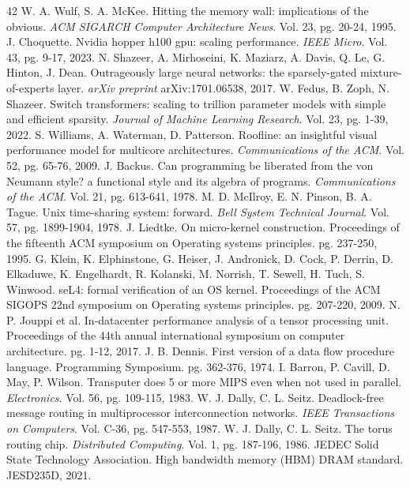 \documentclass[10pt,twocolumn]{article}
\begin{document}
\begin{thebibliography}{42}
 W. A. Wulf, S. A. McKee. Hitting the memory wall: implications of the obvious. \textit{ACM SIGARCH Computer Architecture News}. Vol. 23, pg. 20-24, 1995.
 J. Choquette. Nvidia hopper h100 gpu: scaling performance. \textit{IEEE Micro}. Vol. 43, pg. 9-17, 2023.
 N. Shazeer, A. Mirhoseini, K. Maziarz, A. Davis, Q. Le, G. Hinton, J. Dean. Outrageously large neural networks: the sparsely-gated mixture-of-experts layer. \textit{arXiv preprint} arXiv:1701.06538, 2017.
 W. Fedus, B. Zoph, N. Shazeer. Switch transformers: scaling to trillion parameter models with simple and efficient sparsity. \textit{Journal of Machine Learning Research}. Vol. 23, pg. 1-39, 2022.
 S. Williams, A. Waterman, D. Patterson. Roofline: an insightful visual performance model for multicore architectures. \textit{Communications of the ACM}. Vol. 52, pg. 65-76, 2009.
 J. Backus. Can programming be liberated from the von Neumann style? a functional style and its algebra of programs. \textit{Communications of the ACM}. Vol. 21, pg. 613-641, 1978.
 M. D. McIlroy, E. N. Pinson, B. A. Tague. Unix time-sharing system: forward. \textit{Bell System Technical Journal}. Vol. 57, pg. 1899-1904, 1978.
 J. Liedtke. On micro-kernel construction. Proceedings of the fifteenth ACM symposium on Operating systems principles. pg. 237-250, 1995.
 G. Klein, K. Elphinstone, G. Heiser, J. Andronick, D. Cock, P. Derrin, D. Elkaduwe, K. Engelhardt, R. Kolanski, M. Norrish, T. Sewell, H. Tuch, S. Winwood. seL4: formal verification of an OS kernel. Proceedings of the ACM SIGOPS 22nd symposium on Operating systems principles. pg. 207-220, 2009.
 N. P. Jouppi et al. In-datacenter performance analysis of a tensor processing unit. Proceedings of the 44th annual international symposium on computer architecture. pg. 1-12, 2017.
 J. B. Dennis. First version of a data flow procedure language. Programming Symposium. pg. 362-376, 1974.
 I. Barron, P. Cavill, D. May, P. Wilson. Transputer does 5 or more MIPS even when not used in parallel. \textit{Electronics}. Vol. 56, pg. 109-115, 1983.
 W. J. Dally, C. L. Seitz. Deadlock-free message routing in multiprocessor interconnection networks. \textit{IEEE Transactions on Computers}. Vol. C-36, pg. 547-553, 1987.
 W. J. Dally, C. L. Seitz. The torus routing chip. \textit{Distributed Computing}. Vol. 1, pg. 187-196, 1986.
 JEDEC Solid State Technology Association. High bandwidth memory (HBM) DRAM standard. JESD235D, 2021.

\end{thebibliography}
\end{document}

